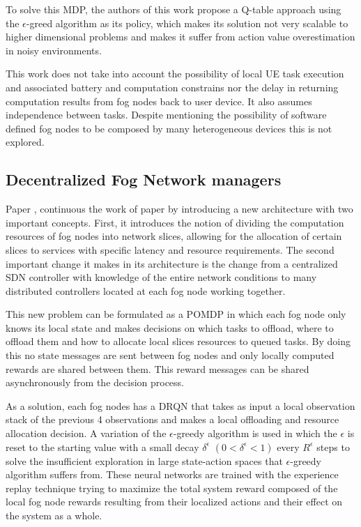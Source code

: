 To solve this \acrshort{MDP}, the authors of this work propose a Q-table approach using the $\epsilon$-greed algorithm as its policy, which makes its solution not very scalable to higher dimensional problems and makes it suffer from action value overestimation in noisy environments.

This work does not take into account the possibility of local \acrshort{UE} task execution and associated battery and computation constrains nor the delay in returning computation results from fog nodes back to user device.  It also assumes independence between tasks. Despite mentioning the possibility of software defined fog nodes to be composed by many heterogeneous devices this is not explored.


\subsection{Decentralized Fog Network managers}
\noindent Paper \cite{fogmulti}, continuous the work of paper \cite{centralfog} by introducing a new architecture with two important concepts. First, it introduces the notion of dividing the computation resources of fog nodes into network slices, allowing for the allocation of certain slices to services with specific latency and resource requirements. The second important change it makes in its architecture is the change from a centralized \acrshort{SDN} controller with knowledge of the entire network conditions to many distributed controllers located at each fog node working together.

This new problem can be formulated as a \acrfull{POMDP} in which each fog node only knows its local state and makes decisions on which tasks to offload, where to offload them and how to allocate local slices resources to queued tasks. By doing this no state messages are sent between fog nodes and only locally computed rewards are shared between them. This reward messages can be shared asynchronously from the decision process.

As a solution, each fog nodes has a \acrfull{DRQN} that takes as input a local observation stack of the previous 4 observations and makes a local offloading and resource allocation decision. A variation of the $\epsilon$-greedy algorithm is used in which the $\epsilon$ is reset to the starting value with a small decay $\delta^\epsilon$ $(0<\delta^\epsilon < 1)$ every $R^\epsilon$ steps to solve the insufficient exploration in large state-action spaces that $\epsilon$-greedy algorithm suffers from. These neural networks are trained with the experience replay technique trying to maximize the total system reward composed of the local fog node rewards resulting from their localized actions and their effect on the system as a whole.

